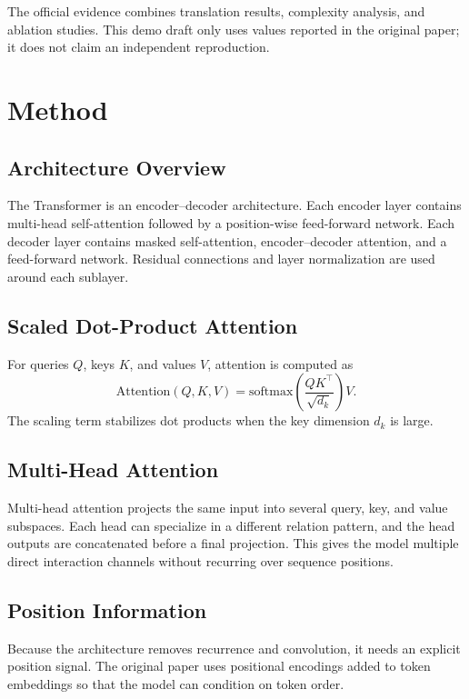 \documentclass{article}
\begin{document}
The official evidence combines translation results, complexity analysis, and ablation studies. This demo draft only uses values reported in the original paper; it does not claim an independent reproduction.

\section{Method}

\subsection{Architecture Overview}

The Transformer is an encoder--decoder architecture. Each encoder layer contains multi-head self-attention followed by a position-wise feed-forward network. Each decoder layer contains masked self-attention, encoder--decoder attention, and a feed-forward network. Residual connections and layer normalization are used around each sublayer.

\subsection{Scaled Dot-Product Attention}

For queries $Q$, keys $K$, and values $V$, attention is computed as
\begin{equation}
\mathrm{Attention}(Q,K,V) =
\mathrm{softmax}\left(\frac{QK^\top}{\sqrt{d_k}}\right)V.
\end{equation}
The scaling term stabilizes dot products when the key dimension $d_k$ is large.

\subsection{Multi-Head Attention}

Multi-head attention projects the same input into several query, key, and value subspaces. Each head can specialize in a different relation pattern, and the head outputs are concatenated before a final projection. This gives the model multiple direct interaction channels without recurring over sequence positions.

\subsection{Position Information}

Because the architecture removes recurrence and convolution, it needs an explicit position signal. The original paper uses positional encodings added to token embeddings so that the model can condition on token order.
\end{document}
